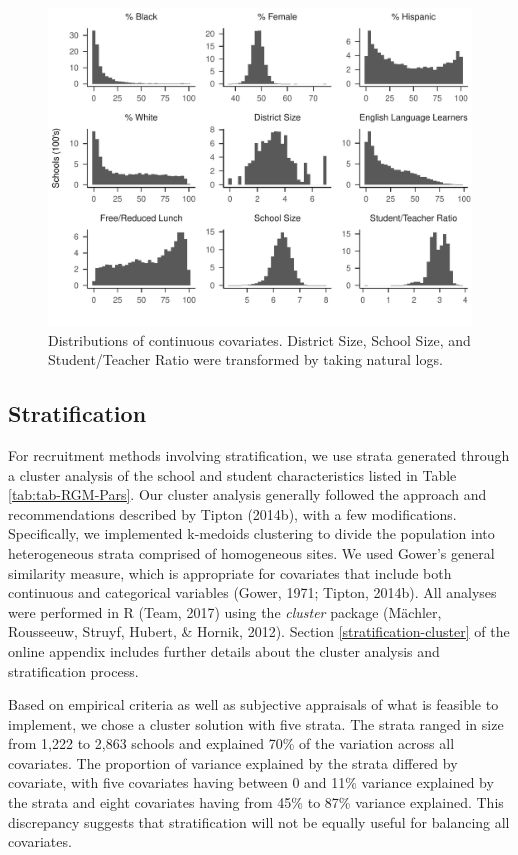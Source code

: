 \documentclass[
  man,floatsintext]{apa6}
\begin{document}
\begin{figure}
\centering
\includegraphics{6---Paper_files/figure-latex/fig-dist1-1.pdf}
\caption{\label{fig:fig-dist1}Distributions of continuous covariates. District Size, School Size, and Student/Teacher Ratio were transformed by taking natural logs.}
\end{figure}

\hypertarget{stratification}{%
\subsection*{Stratification}\label{stratification}}

For recruitment methods involving stratification, we use strata generated through a cluster analysis of the school and student characteristics listed in Table \ref{tab:tab-RGM-Pars}.
Our cluster analysis generally followed the approach and recommendations described by Tipton (2014b), with a few modifications. Specifically, we implemented k-medoids clustering to divide the population into heterogeneous strata comprised of homogeneous sites. We used Gower's general similarity measure, which is appropriate for covariates that include both continuous and categorical variables (Gower, 1971; Tipton, 2014b).
All analyses were performed in R (Team, 2017) using the \emph{cluster} package (Mächler, Rousseeuw, Struyf, Hubert, \& Hornik, 2012).
Section \ref{stratification-cluster} of the online appendix includes further details about the cluster analysis and stratification process.

Based on empirical criteria as well as subjective appraisals of what is feasible to implement, we chose a cluster solution with five strata.
The strata ranged in size from 1,222 to 2,863 schools and explained 70\% of the variation across all covariates. The proportion of variance explained by the strata differed by covariate, with five covariates having between 0 and 11\% variance explained by the strata and eight covariates having from 45\% to 87\% variance explained. This discrepancy suggests that stratification will not be equally useful for balancing all covariates.
\end{document}
